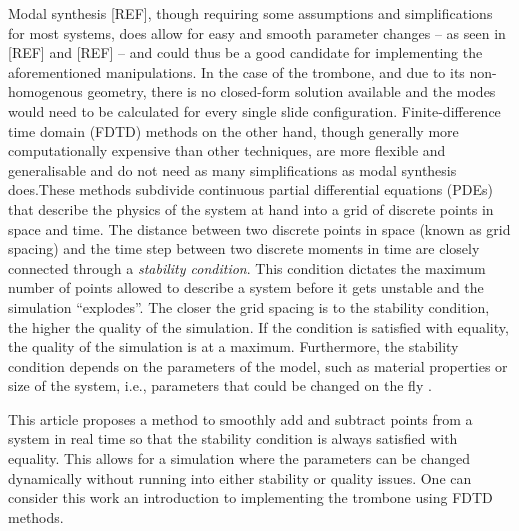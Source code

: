 Modal synthesis [REF], though requiring some assumptions and simplifications for most systems, does allow for easy and smooth parameter changes -- as seen in [REF] and [REF] -- and could thus be a good candidate for implementing the aforementioned manipulations. In the case of the trombone, and due to its non-homogenous geometry, there is no closed-form solution available and the modes would need to be calculated for every single slide configuration. Finite-difference time domain (FDTD) methods on the other hand, though generally more computationally expensive than other techniques, are more flexible and generalisable and do not need as many simplifications as modal synthesis does. These methods subdivide continuous partial differential equations (PDEs) that describe the physics of the system at hand into a grid of discrete points in space and time. 
%
%
The distance between two discrete points in space (known as grid spacing) and the time step between two discrete moments in time are closely connected through a \textit{stability condition}. This condition dictates the maximum number of points allowed to describe a system before it gets unstable and the simulation ``explodes''. The closer the grid spacing is to the stability condition, the higher the quality of the simulation. If the condition is satisfied with equality, the quality of the simulation is at a maximum.  
Furthermore, the stability condition depends on the parameters of the model, such as material properties or size of the system, i.e., parameters that could be changed on the fly \SBcomment[As above].

This article proposes a method to smoothly add and subtract points from a system in real time so that the stability condition is always satisfied with equality. This allows for a simulation where the parameters can be changed dynamically without running into either stability or quality issues. One can consider this work an introduction to implementing the trombone using FDTD methods.

